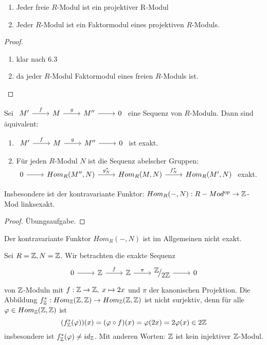 \begin{fo}
	\begin{enumerate} [label= \alph*)]
		\item Jeder freie $R$-Modul ist ein projektiver R-Modul
		\item Jeder $R$-Modul ist ein Faktormodul eines projektiven $R$-Moduls. 
	\end{enumerate}
\end{fo}
\begin{proof}
	\begin{enumerate} [label= \alph*)]
		\item klar nach 6.3
		\item da jeder $R$-Modul Faktormodul eines freien $R$-Moduls ist. 
	\end{enumerate}
\end{proof}
\begin{sa}
	Sei $\begin{tikzcd}
	 M' \arrow{r}{f} & M \arrow{r}{g} & M'' \arrow{r} & 0
	\end{tikzcd} $ eine Sequenz von $R$-Moduln. Dann sind äquivalent:
	\begin{enumerate} [label= \roman*)]
		\item $\begin{tikzcd}
		M' \arrow{r}{f} & M \arrow{r}{g} & M'' \arrow{r} & 0
		\end{tikzcd} $ ist exakt.
		\item Für jeden $R$-Modul $N$ ist die Sequenz abelscher Gruppen: \\
		$\begin{tikzcd}
		0  \arrow{r} & Hom_{R}(M'',N) \arrow{r}{g_{N}^{*}} & Hom_{R}(M,N)  \arrow{r}{f_{N}^{*}} & Hom_{R}(M',N) \end{tikzcd}$ exakt.
	\end{enumerate}
	Insbesondere ist der kontravariante Funktor: $Hom_R(-,N): R-Mod^{op} \to \mathbb{Z}$-Mod  linksexakt.
\end{sa}
\begin{proof}
	Übungsaufgabe.
\end{proof}
\begin{anm}
	Der kontravariante Funktor $Hom_R(-,N) $ ist im Allgemeinen nicht exakt.
\end{anm}
\begin{bsp}
	Sei $ R= \mathbb{Z} , N = \mathbb{Z} $. Wir betrachten die exakte Sequenz \\
	 $$\begin{tikzcd}
	0  \arrow{r} & \Z \arrow{r}{f} & \Z \arrow{r}{\pi} & \QR{\Z}{2\Z} \arrow{r} & 0
	\end{tikzcd} $$ von $\mathbb{Z}$-Moduln mit $f: \mathbb{Z} \to \mathbb{Z} ,\; x \mapsto 2x$ und $ \pi $ der kanonischen Projektion. Die Abbildung $ f_{\mathbb{Z}}^{*} : Hom_{\mathbb{Z}}(\mathbb{Z},\mathbb{Z}) \to Hom_{\mathbb{Z}}(\mathbb{Z},\mathbb{Z})$ ist nicht surjektiv, denn für alle $\varphi \in Hom_{\mathbb{Z}}(\mathbb{Z},\mathbb{Z})$ ist $$ (f_{\mathbb{Z}}^{*}(\varphi))(x) = (\varphi \circ f)(x) = \varphi(2x) =2 \varphi(x) \in 2\mathbb{Z}$$
	insbesondere ist $ f_{\mathbb{Z}}^{*}(\varphi) \neq id_{\mathbb{Z}}$. Mit anderen Worten: $\mathbb{Z}$ ist kein injektiver $\mathbb{Z}$-Modul.
\end{bsp}
